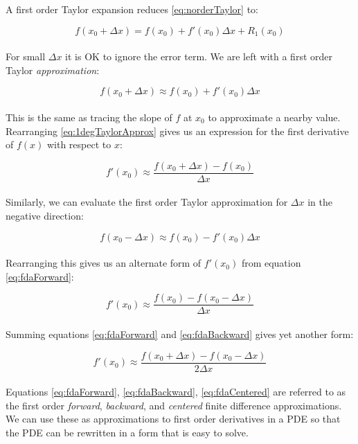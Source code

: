 {%

A first order Taylor expansion reduces \ref{eq:norderTaylor} to:
  
 \begin{equation}\label{eq:1degTaylor}
  f(x_{0} + \Delta  x) = f(x_{0}) + f'(x_{0})\Delta x + R_{1}(x_{0})
  \end{equation}
    \\
  For small $\Delta  x$ it is OK to ignore the error term.  We are left with a first order Taylor \textit{approximation}:
  
   \begin{equation}\label{eq:1degTaylorApprox}
  f(x_{0} + \Delta  x) \approx f(x_{0}) + f'(x_{0})\Delta x
  \end{equation}
    \\
This is the same as tracing the slope of $f$ at $x_{0}$ to approximate a nearby value.  Rearranging \ref{eq:1degTaylorApprox} gives us an expression for the first derivative of $f(x)$ with respect to $x$:

 \begin{equation}\label{eq:fdaForward}
 f'(x_{0}) \approx \frac{f(x_{0} + \Delta  x) - f(x_{0})}{\Delta  x}
  \end{equation}
    \\
Similarly, we can evaluate the first order Taylor approximation for $\Delta x$ in the negative direction:

     \begin{equation}
 f(x_{0} - \Delta  x) \approx f(x_{0}) - f'(x_{0})\Delta x
  \end{equation}
    \\
  Rearranging this gives us an alternate form of $ f'(x_{0})$ from equation \ref{eq:fdaForward}:

 \begin{equation}\label{eq:fdaBackward}
 f'(x_{0}) \approx \frac{f(x_{0}) - f(x_{0} - \Delta  x)}{\Delta  x}
  \end{equation}
    \\
Summing equations \ref{eq:fdaForward} and \ref{eq:fdaBackward} gives yet another form:
  
     \begin{equation}\label{eq:fdaCentered}
 f'(x_{0}) \approx \frac{f(x_{0} + \Delta  x) - f(x_{0} - \Delta  x)}{2\Delta x}
  \end{equation}
  \\
  Equations \ref{eq:fdaForward}, \ref{eq:fdaBackward}, \ref{eq:fdaCentered} are referred to as the first order \textit{forward}, \textit{backward}, and \textit{centered} finite difference approximations.  We can use these as approximations to first order derivatives in a PDE so that the PDE can be rewritten in a form that is easy to solve.
  
}
